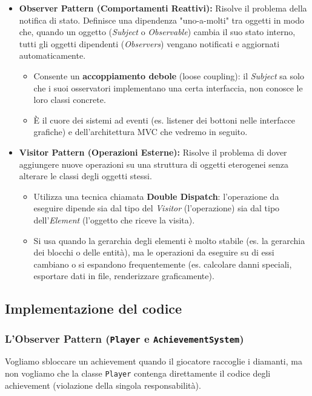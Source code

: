 \documentclass[12pt, a4paper]{article}
\begin{document}
\newpage

\begin{itemize}
    \item \textbf{Observer Pattern (Comportamenti Reattivi):} 
    Risolve il problema della notifica di stato. Definisce una dipendenza "uno-a-molti" tra oggetti in modo che, quando un oggetto (\textit{Subject} o \textit{Observable}) cambia il suo stato interno, tutti gli oggetti dipendenti (\textit{Observers}) vengano notificati e aggiornati automaticamente.
    \begin{itemize}
        \item Consente un \textbf{accoppiamento debole} (loose coupling): il \textit{Subject} sa solo che i suoi osservatori implementano una certa interfaccia, non conosce le loro classi concrete.
        \item È il cuore dei sistemi ad eventi (es. listener dei bottoni nelle interfacce grafiche) e dell'architettura MVC che vedremo in seguito.
    \end{itemize}

    \item \textbf{Visitor Pattern (Operazioni Esterne):} 
    Risolve il problema di dover aggiungere nuove operazioni su una struttura di oggetti eterogenei senza alterare le classi degli oggetti stessi.
    \begin{itemize}
        \item Utilizza una tecnica chiamata \textbf{Double Dispatch}: l'operazione da eseguire dipende sia dal tipo del \textit{Visitor} (l'operazione) sia dal tipo dell'\textit{Element} (l'oggetto che riceve la visita).
        \item Si usa quando la gerarchia degli elementi è molto stabile (es. la gerarchia dei blocchi o delle entità), ma le operazioni da eseguire su di essi cambiano o si espandono frequentemente (es. calcolare danni speciali, esportare dati in file, renderizzare graficamente).
    \end{itemize}
\end{itemize}

\newpage

\subsection{Implementazione del codice}

\subsubsection{L'Observer Pattern (\texttt{Player} e \texttt{AchievementSystem})}
Vogliamo sbloccare un achievement quando il giocatore raccoglie i diamanti, ma non vogliamo che la classe \texttt{Player} contenga direttamente il codice degli achievement (violazione della singola responsabilità).
\end{document}
